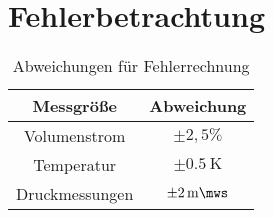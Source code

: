 \chapter{Fehlerbetrachtung}
\label{sec:fehler}

\vspace*{-2.5mm}
\renewcommand{\arraystretch}{1.2}
\begin{table}[h!]
	\centering
	\caption{Abweichungen für Fehlerrechnung}
	\label{tab:abweichungen}
	\begin{tabulary}{\textwidth}{C|C}
		\hline 
		\textbf{Messgröße} & \textbf{Abweichung} \\ 
		\hline 
		Volumenstrom &  $\pm2,5\%$\\ 
		Temperatur & $\pm \SI{0.5}{\kelvin} $\\ 
		Druckmessungen &  $\pm \SI{2}{\milli \mws}$\\ 
		\hline 
	\end{tabulary}
\end{table}
\FloatBarrier
\vspace*{-2.5mm}
